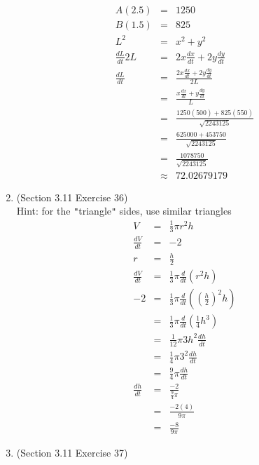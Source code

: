 \documentclass{article}
\begin{document}
\begin{enumerate}
        \begin{eqnarray}
            A(2.5) &=& 1250 \\
            B(1.5) &=& 825 \\
            L^2 &=& x^2 + y^2 \\
            \frac{dL}{dt}2L &=& 2x\frac{dx}{dt} + 2y\frac{dy}{dt} \\
            \frac{dL}{dt} &=& \frac{2x\frac{dx}{dt} + 2y\frac{dy}{dt}}{2L} \\
                          &=& \frac{x\frac{dx}{dt} + y\frac{dy}{dt}}{L} \\
                          &=& \frac{1250(500) + 825(550)}{\sqrt{2243125}} \\
                          &=& \frac{625000 + 453750}{\sqrt{2243125}} \\
                          &=& \frac{1078750}{\sqrt{2243125}} \\
                          &\approx& 72.02679179
        \end{eqnarray}
    \item (Section 3.11 Exercise 36)
        \\ Hint: for the \verb|"|triangle\verb|"| sides, use similar triangles
        \begin{eqnarray}
            V &=& \frac{1}{3} \pi r^2 h \\
            \frac{dV}{dt} &=& -2 \\
            r &=& \frac{h}{2} \\
            \frac{dV}{dt} &=& \frac{1}{3}\pi \frac{d}{dt}\left(r^2h\right) \\
            -2 &=& \frac{1}{3}\pi \frac{d}{dt}\left(\left(\frac{h}{2}\right)^2h\right) \\
               &=& \frac{1}{3}\pi \frac{d}{dt}\left(\frac{1}{4}h^3\right) \\
               &=& \frac{1}{12}\pi 3h^2\frac{dh}{dt} \\
               &=& \frac{1}{4}\pi 3^2\frac{dh}{dt} \\
               &=& \frac{9}{4}\pi\frac{dh}{dt} \\
            \frac{dh}{dt} &=& \frac{-2}{\frac{9}{4}\pi} \\
                          &=& \frac{-2(4)}{9\pi} \\
                          &=& \frac{-8}{9\pi}
        \end{eqnarray}
    \item (Section 3.11 Exercise 37)
        \begin{eqnarray}

\end{eqnarray}
\end{enumerate}
\end{document}
